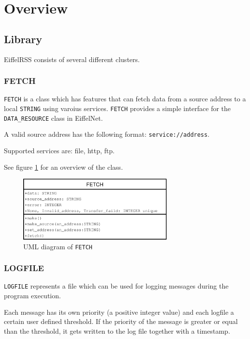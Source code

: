 \documentclass[a4paper,fleqn,titlepage]{article}
\begin{document}
\section{Overview}
\label{sec:overview}


\subsection{Library}
\label{sec:library}

EiffelRSS consists of several different clusters.


\subsubsection{FETCH}

\texttt{FETCH} is a class which has features that can fetch data from
a source address to a local \texttt{STRING} using varoius services.
\texttt{FETCH} provides a simple interface for the
\texttt{DATA\_RESOURCE} class in EiffelNet.

A valid source address has the following format:
\texttt{service://address}.

Supported services are: file, http, ftp.

See figure \ref{fig:fetch} for an overview of the class.

\begin{figure}[htbp]
  \centering
  \includegraphics[width=0.7\textwidth]{./figures/fetch}
  \caption{UML diagram of \texttt{FETCH}}
  \label{fig:fetch}
\end{figure}


\subsubsection{LOGFILE}

\texttt{LOGFILE} represents a file which can be used for logging
messages during the program execution.

Each message has its own priority (a positive integer value) and each
logfile a certain user defined threshold. If the priority of the
message is greater or equal than the threshold, it gets written to the
log file together with a timestamp.
\end{document}
